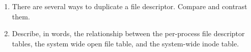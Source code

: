 \documentclass[letterpaper,10pt,onecolumn,titlepage]{article}
\begin{document}
\begin{enumerate}
\item There are several ways to duplicate a file descriptor. Compare and contrast them.

\begin{quote}

\end{quote}

\item \label{last} Describe, in words, the relationship between the per-process file
  descriptor tables, the system wide open file table, and the system-wide inode table.

\begin{quote}

\end{quote}

\end{enumerate}

\end{document}
